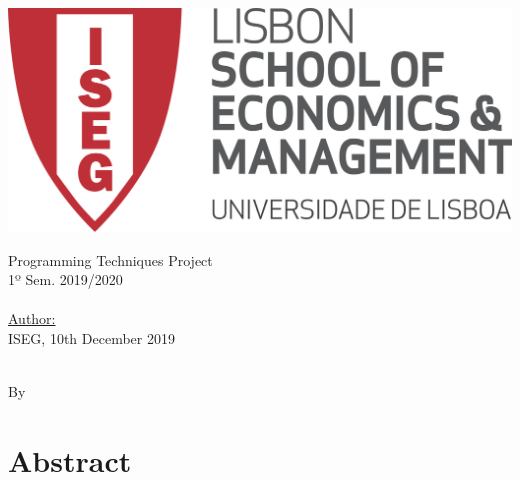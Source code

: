\documentclass [12pt,a4paper,oneside]{article}
\begin{document}

\makeatletter
\begin{titlepage}

\pagestyle{empty}
\centering

\begin{flushleft}
    \includegraphics[width=0.3\linewidth]{graphics/Logotipo_ISEG.png}
\end{flushleft}    
    \vspace{3cm}
   {\textsf{\Huge Programming Techniques Project}} \\ [1cm]
    {\textsf{\Large 1º Sem. 2019/2020}} \\ [3cm]
  {\textsf{\Large \@title }} \\ [2cm] %
\textsf{
\underline{Author:} \\
\@author}
    \vfill
    {\textsf{\Large ISEG, 10th  December 2019}}  %
 \clearpage 
 \end{titlepage}
 \makeatother



	\newpage %
	\thispagestyle{plain}%



\makeatletter	
\begin{center} %


\textsc{\@title}\\ %
    
By \@author \\
    

\end{center} %
\makeatother

\section*{Abstract}
\end{document}
